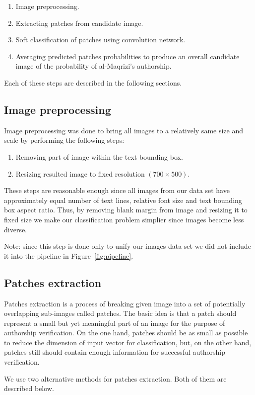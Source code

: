 \documentclass[a4paper,conference]{IEEEtran}
\begin{document}
\begin{enumerate}
	\item Image preprocessing.
	\item Extracting patches from candidate image.
	\item Soft classification of patches using convolution network.
	\item Averaging predicted patches probabilities to produce an overall candidate image of the probability of al-Maqrizi's authorship.
\end{enumerate}

Each of these steps are described in the following sections.	


\subsection{Image preprocessing}
Image preprocessing was done to bring all images to a relatively same size and scale by performing the following steps:
\begin{enumerate}
	\item Removing part of image within the text bounding box.
	\item Resizing resulted image to fixed resolution $(700\times 500)$.
\end{enumerate}
These steps are reasonable enough since all images from our data set have approximately equal number of text lines, relative font size and text bounding box aspect ratio. Thus, by removing blank margin from image and resizing it to fixed size we make our classification problem simplier since images become less diverse. 

Note: since this step is done only to unify our images data set we did not include it into the pipeline in Figure~\ref{fig:pipeline}.

\subsection{Patches extraction}
Patches extraction is a process of breaking given image into a set of potentially overlapping sub-images called patches. The basic idea is that a patch should represent a small but yet meaningful part of an image for the purpose of authorship verification. On the one hand, patches should be as small as possible to reduce the dimension of input vector for classification, but, on the other hand, patches still should contain enough information for successful authorship verification.  

We use two alternative methods for patches extraction. Both of them are described below.
\end{document}
